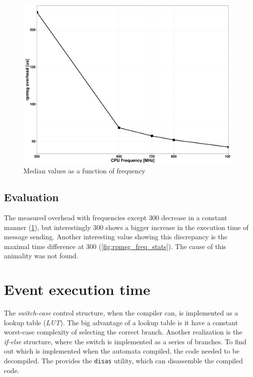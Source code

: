 \begin{figure}[h]
	\centering
	\includegraphics[width = \textwidth]{include/figures/rpmsg_freq}
	\caption{Median values as a function of \cpu{} frequency}
\label{fig:rpmsg_overhead_plot}
\end{figure}

\subsection{Evaluation}

The measured overhead with frequencies except \si{300}{\MHz} decrease in a constant manner (\cref{fig:rpmsg_overhead_plot}), but interestingly \si{300}{\MHz} shows a bigger increase in the execution time of message sending. Another interesting value showing this discrepancy is the maximal time difference at \si{300}{\MHz} (\cref{fig:rpmsg_freq_stats}). The cause of this animality was not found.

\section{Event execution time}

The \emph{switch-case} control structure, when the compiler can, is implemented as a lookup table (\emph{LUT}). The big advantage of a lookup table is it have a constant worst-case complexity of selecting the correct branch. Another realization is the \emph{if-else} structure, where the switch is implemented as a series of branches. To find out which is implemented when the automata compiled, the code needed to be decompiled. The \pru{}  provides the \texttt{disas} utility, which can disassemble the compiled code.

